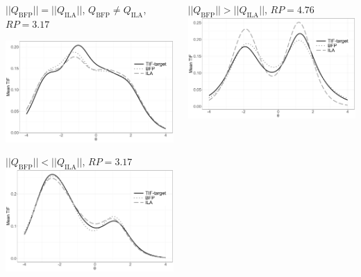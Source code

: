 \documentclass[aspectratio=149, compress]{beamer}
\begin{document}
\begin{frame}
	
	\begin{columns}[T]
		\begin{column}{.50\linewidth}
			
			\centering
			\footnotesize{$||Q_{\text{BFP}}|| = ||Q_{\text{ILA}}||$, $Q_{\text{BFP}} \neq Q_{\text{ILA}}$, $RP = 3.17$}
			
			\includegraphics[width=.80\linewidth]{img/equalClose.pdf}	
			
			
			\centering
			\footnotesize{$||Q_{\text{BFP}}|| < ||Q_{\text{ILA}}||$, $RP = 3.17$}
			\includegraphics[width=.80\linewidth]{img/moreClose.pdf}	
			
			
			
		\end{column}
		
		\begin{column}{.50\linewidth}
			
			\centering
			\footnotesize{$||Q_{\text{BFP}}|| > ||Q_{\text{ILA}}||$, $RP = 4.76$}
			\includegraphics[width=.80\linewidth]{img/lessClose.pdf}	
			

\end{column}
\end{columns}
\end{frame}
\end{document}
